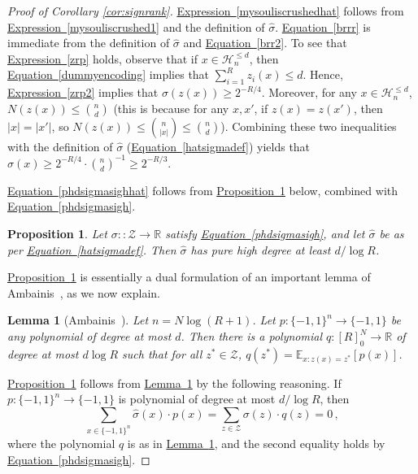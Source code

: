 \documentclass[11pt]{article}
\numberwithin{equation}{section}
\newtheorem{lemma}[theorem]{Lemma}
\newtheorem{proposition}[theorem]{Proposition}
\theoremstyle{definition}
\theoremstyle{plain}
\newcommand{\R}{\mathbb R}
\newcommand{\expref}[2]{\hyperref[#2]{#1~\ref{#2}}}
\newcommand{\expeqref}[2]{\hyperref[#2]{#1~\eqref{#2}}}
\newcommand{\bits}{\{-1,1\}}
\begin{document}
\begin{proof}[Proof of Corollary \ref{cor:signrank}]
\expeqref{Expression}{mysouliscrushedhat} follows from \expeqref{Expression}{mysouliscrushed1} and the definition of $\hat{\sigma}$.
\expeqref{Equation}{brrr} is immediate from the definition of $\hat{\sigma}$ and \expeqref{Equation}{brr2}. 
To see that \expeqref{Expression}{zrp} holds, observe that if $x \in \mathcal{H}^{\leq d}_n$, then
\expeqref{Equation}{dummyencoding} implies that $\sum_{i=1}^{R} z_i(x) \leq d$. Hence,
\expeqref{Expression}{zrp2} implies that $\sigma(z(x)) \geq 2^{-R/4}$. Moreover, for any $x \in \mathcal{H}^{\leq d}_{n}$,
$N(z(x)) \leq {n \choose d}$ (this is because for any $x, x'$, if $z(x) = z(x')$, then $|x|=|x'|$, 
so $N(z(x)) \leq {n \choose |x|} \leq {n \choose d}$).
Combining these two inequalities with the definition of $\hat{\sigma}$ (\expeqref{Equation}{hatsigmadef}) yields
that $\hat{\sigma}(x) \geq 2^{-R/4} \cdot {n \choose d}^{-1} \geq 2^{-R/3}$. 


\expeqref{Equation}{phdsigmasighhat} follows from \expref{Proposition}{keysrprop} below, combined with \expeqref{Equation}{phdsigmasigh}.

\begin{proposition}\label{keysrprop} Let $\sigma \colon\colon \mathcal{Z} \to \R$
	satisfy \expeqref{Equation}{phdsigmasigh}, and let $\hat{\sigma}$ be as per \expeqref{Equation}{hatsigmadef}. 
	Then  
	$\hat{\sigma}$ has pure high degree at least $d/\log R$. 
\end{proposition}
\expref{Proposition}{keysrprop} is essentially a dual formulation of an important lemma of Ambainis~\cite{ambainissmallrange}, as we now explain. 

%
\begin{lemma}[Ambainis~\cite{ambainissmallrange}] \label{ambainislemma}
	Let $n=N \log(R+1)$. Let $p \colon \bits^n \to \bits$ be any polynomial of degree at most $d$. 
	Then there is a polynomial $q \colon [R]_0^N \to \R$ of degree at most $d \log R$
	such that for all $z^* \in \mathcal{Z}$, $q(z^*) = \mathbb{E}_{x \colon z(x)=z^*}[p(x)]$.
\end{lemma}
\expref{Proposition}{keysrprop} follows from \expref{Lemma}{ambainislemma} by the following reasoning.
If $p \colon \bits^n \to \bits$ is polynomial of degree at most $d / \log R$,
then \begin{equation} \sum_{x \in \bits^n} \hat{\sigma}(x) \cdot p(x) = \sum_{z \in \mathcal{Z}} \sigma(z) \cdot q(z) =0\,, \label{sighsighsighsigh}\end{equation}
where the polynomial $q$ is as in \expref{Lemma}{ambainislemma}, and the second equality holds by \expeqref{Equation}{phdsigmasigh}.


\end{proof}
\end{document}
